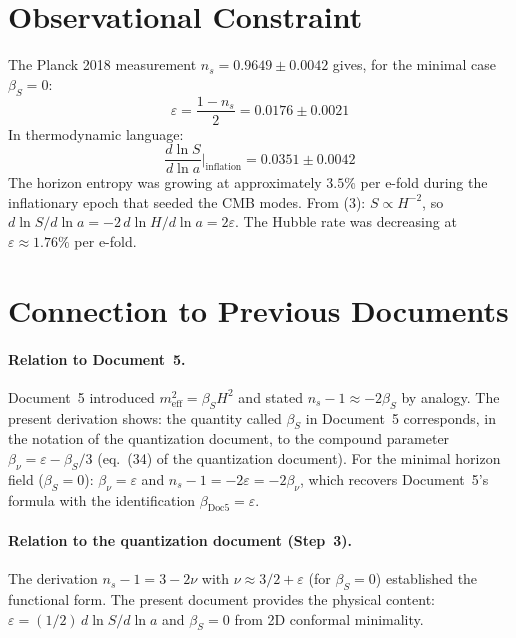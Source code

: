 \documentclass[12pt,a4paper]{article}
\begin{document}
\section{Observational Constraint}

The Planck 2018 measurement $n_s = 0.9649 \pm 0.0042$ gives, for the minimal case $\beta_S = 0$:
\begin{equation}
\varepsilon = \frac{1 - n_s}{2} = 0.0176 \pm 0.0021 \tag{20}
\end{equation}
In thermodynamic language:
\begin{equation}
\frac{d\ln S}{d\ln a}\bigg|_\text{inflation} = 0.0351 \pm 0.0042 \tag{21}
\end{equation}
The horizon entropy was growing at approximately $3.5\%$ per e-fold during the inflationary epoch that seeded the CMB modes. From (3): $S \propto H^{-2}$, so $d\ln S/d\ln a = -2\, d\ln H/d\ln a = 2\varepsilon$. The Hubble rate was decreasing at $\varepsilon \approx 1.76\%$ per e-fold.

\section{Connection to Previous Documents}

\paragraph{Relation to Document~5.}
Document~5 introduced $m_\text{eff}^2 = \beta_S H^2$ and stated $n_s - 1 \approx -2\beta_S$ by analogy. The present derivation shows: the quantity called $\beta_S$ in Document~5 corresponds, in the notation of the quantization document, to the compound parameter $\beta_\nu = \varepsilon - \beta_S/3$ (eq.~(34) of the quantization document). For the minimal horizon field ($\beta_S = 0$): $\beta_\nu = \varepsilon$ and $n_s - 1 = -2\varepsilon = -2\beta_\nu$, which recovers Document~5's formula with the identification $\beta_\text{Doc5} = \varepsilon$.

\paragraph{Relation to the quantization document (Step~3).}
The derivation $n_s - 1 = 3 - 2\nu$ with $\nu \approx 3/2 + \varepsilon$ (for $\beta_S = 0$) established the functional form. The present document provides the physical content: $\varepsilon = (1/2)\, d\ln S/d\ln a$ and $\beta_S = 0$ from 2D conformal minimality.
\end{document}

